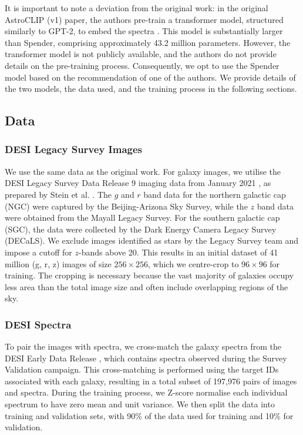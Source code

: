 \documentclass[a4paper,12pt]{article}
\begin{document}
It is important to note a deviation from the original work: in the original AstroCLIP (v1) paper, the authors pre-train a transformer model, structured similarly to GPT-2, to embed the spectra \cite{astroclip}. This model is substantially larger than Spender, comprising approximately 43.2 million parameters. However, the transformer model is not publicly available, and the authors do not provide details on the pre-training process. Consequently, we opt to use the Spender model based on the recommendation of one of the authors. We provide details of the two models, the data used, and the training process in the following sections.





\subsection{Data}
\label{sec:data}
\subsubsection{DESI Legacy Survey Images}
We use the same data as the original work. For galaxy images, we utilise the DESI Legacy Survey Data Release 9 imaging data from January 2021 \cite{DESI}, as prepared by Stein et al. \cite{stein}. The $g$ and $r$ band data for the northern galactic cap (NGC) were captured by the Beijing-Arizona Sky Survey, while the $z$ band data were obtained from the Mayall Legacy Survey. For the southern galactic cap (SGC), the data were collected by the Dark Energy Camera Legacy Survey (DECaLS). We exclude images identified as stars by the Legacy Survey team and impose a cutoff for $z$-bands above 20. This results in an initial dataset of 41 million (g, r, z) images of size $256 \times 256$, which we centre-crop to $96 \times 96$ for training. The cropping is necessary because the vast majority of galaxies occupy less area than the total image size and often include overlapping regions of the sky.


\subsubsection{DESI Spectra}
To pair the images with spectra, we cross-match the galaxy spectra from the DESI Early Data Release \cite{DESI2023}, which contains spectra observed during the Survey Validation campaign. This cross-matching is performed using the target IDs associated with each galaxy, resulting in a total subset of 197,976 pairs of images and spectra. During the training process, we Z-score normalise each individual spectrum to have zero mean and unit variance. We then split the data into training and validation sets, with 90\% of the data used for training and 10\% for validation.
\end{document}
